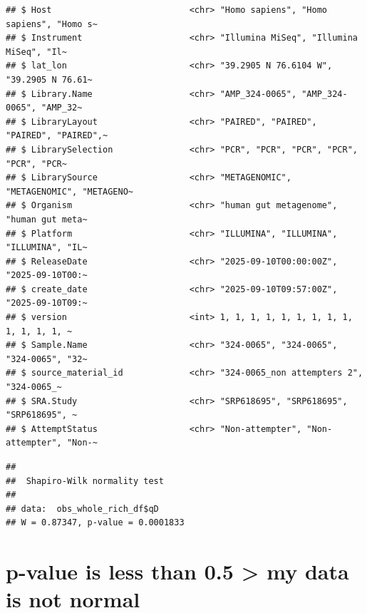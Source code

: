 \documentclass[
]{article}
\newenvironment{Shaded}{\begin{snugshade}}{\end{snugshade}}
\newcommand{\DecValTok}[1]{\textcolor[rgb]{0.00,0.00,0.81}{#1}}
\newcommand{\FunctionTok}[1]{\textcolor[rgb]{0.13,0.29,0.53}{\textbf{#1}}}
\newcommand{\NormalTok}[1]{#1}
\newcommand{\OtherTok}[1]{\textcolor[rgb]{0.56,0.35,0.01}{#1}}
\newcommand{\SpecialCharTok}[1]{\textcolor[rgb]{0.81,0.36,0.00}{\textbf{#1}}}
\begin{document}
\begin{verbatim}
## $ Host                           <chr> "Homo sapiens", "Homo sapiens", "Homo s~
## $ Instrument                     <chr> "Illumina MiSeq", "Illumina MiSeq", "Il~
## $ lat_lon                        <chr> "39.2905 N 76.6104 W", "39.2905 N 76.61~
## $ Library.Name                   <chr> "AMP_324-0065", "AMP_324-0065", "AMP_32~
## $ LibraryLayout                  <chr> "PAIRED", "PAIRED", "PAIRED", "PAIRED",~
## $ LibrarySelection               <chr> "PCR", "PCR", "PCR", "PCR", "PCR", "PCR~
## $ LibrarySource                  <chr> "METAGENOMIC", "METAGENOMIC", "METAGENO~
## $ Organism                       <chr> "human gut metagenome", "human gut meta~
## $ Platform                       <chr> "ILLUMINA", "ILLUMINA", "ILLUMINA", "IL~
## $ ReleaseDate                    <chr> "2025-09-10T00:00:00Z", "2025-09-10T00:~
## $ create_date                    <chr> "2025-09-10T09:57:00Z", "2025-09-10T09:~
## $ version                        <int> 1, 1, 1, 1, 1, 1, 1, 1, 1, 1, 1, 1, 1, ~
## $ Sample.Name                    <chr> "324-0065", "324-0065", "324-0065", "32~
## $ source_material_id             <chr> "324-0065_non attempters 2", "324-0065_~
## $ SRA.Study                      <chr> "SRP618695", "SRP618695", "SRP618695", ~
## $ AttemptStatus                  <chr> "Non-attempter", "Non-attempter", "Non-~
\end{verbatim}

\begin{Shaded}
\end{Shaded}

\begin{verbatim}
## 
##  Shapiro-Wilk normality test
## 
## data:  obs_whole_rich_df$qD
## W = 0.87347, p-value = 0.0001833
\end{verbatim}

\hypertarget{p-value-is-less-than-0.5-my-data-is-not-normal}{%
\section{p-value is less than 0.5 \textgreater{} my data is not
normal}\label{p-value-is-less-than-0.5-my-data-is-not-normal}}
\end{document}
